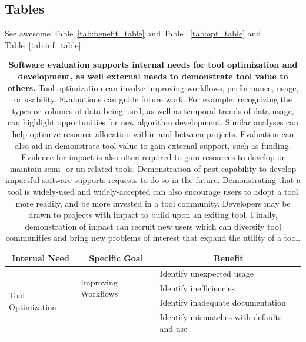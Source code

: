 \documentclass{article}
\begin{document}
\subsection{Tables}

See awesome Table~\ref{tab:benefit_table}  and Table ~\ref{tab:opt_table} and Table~\ref{tab:inf_table} .
\renewcommand{\arraystretch}{1.1} %


\begin{table}
 \caption{\textbf{Software evaluation supports internal needs for tool optimization and development, as well external needs to demonstrate tool value 
 to others.} Tool optimization can involve improving workflows, performance, usage, or usability. Evaluations can guide future work. For example, recognizing the types or volumes of data being used, as well as temporal trends of data usage, can highlight opportunities for new algorithm development. Similar analyses can help optimize resource allocation within and between projects. Evaluation can also aid in demonstrate tool value to gain external support, such as funding.  Evidence for impact is also often required to gain resources to develop or maintain semi- or un-related tools. Demonstration of past capability to develop impactful software supports requests to do so in the future.  Demonstrating that a tool is widely-used and widely-accepted can also encourage users to adopt a tool more readily, and be more invested in a tool community. Developers may be drawn to projects with impact to build upon an exiting tool. Finally, demonstration of impact can recruit new users which can diversify tool communities and bring new problems of interest that expand the utility of a tool.}
  \centering
  \begin{tabular} {|p{}|p{}|p{}|}
    \hline
    \multicolumn{1}{|c|}{\cellcolor[gray]{.9} \textbf{Internal Need}} 
    & \multicolumn{1}{|c|}{\cellcolor[gray]{.9} \textbf{Specific Goal}}
    & \multicolumn{1}{|c|}{\cellcolor[gray]{.9} \textbf{Benefit}}\\[1.1ex]
    \hline
    \multirow{17}{*}{Tool Optimization}               
    & \multirow{3}{*}{Improving Workflows} & 
    Identify unexpected usage \\
    & &
    Identify inefficiencies \\
    & &
    Identify inadequate documentation\\ \cline{2-3}
    &   \multirow{4}{*}{  }
    & 
     Identify mismatches with defaults and use \\

\end{tabular}
\end{table}
\end{document}
